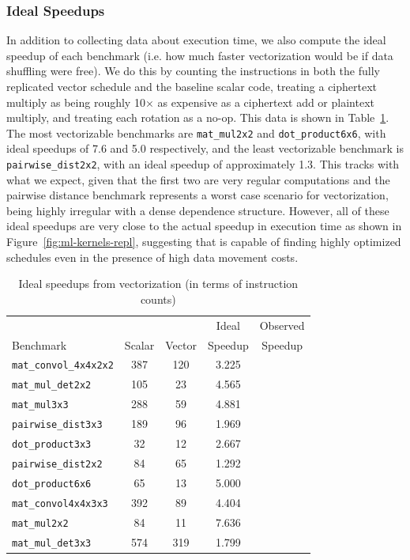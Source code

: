 \subsubsection*{Ideal Speedups}
In addition to collecting data about execution time, we also compute the ideal speedup of each benchmark (i.e. how much faster vectorization would be if data shuffling were free).
We do this by counting the instructions in both the fully replicated vector schedule and the baseline scalar code, treating a ciphertext multiply as being roughly 10$\times$ as expensive as a ciphertext add or plaintext multiply, and treating each rotation as a no-op. 
This data is shown in Table~\ref{tab:ideal-speedup}.
The most vectorizable benchmarks are \texttt{mat\_mul2x2} and \texttt{dot\_product6x6}, with ideal speedups of 7.6 and 5.0 respectively, and the least vectorizable benchmark is \texttt{pairwise\_dist2x2}, with an ideal speedup of approximately 1.3.
This tracks with what we expect, given that the first two are very regular computations and the pairwise distance benchmark represents a worst case scenario for vectorization, being highly irregular with a dense dependence structure.
However, all of these ideal speedups are very close to the actual speedup in execution time as shown in Figure~\ref{fig:ml-kernels-repl}, suggesting that \system is capable of finding highly optimized schedules even in the presence of high data movement costs.


\begin{table}
    \begin{tabular}{lcccc}
        \toprule    
         & & & Ideal & Observed\\
        Benchmark & Scalar & Vector & Speedup & Speedup\\\midrule
        \texttt{mat\_convol\_4x4x2x2} & 387 & 120 & 3.225\\
        \texttt{mat\_mul\_det2x2} & 105 & 23 & 4.565\\
        \texttt{mat\_mul3x3} & 288 & 59 & 4.881\\
        \texttt{pairwise\_dist3x3} & 189 & 96 & 1.969\\
        \texttt{dot\_product3x3} & 32 & 12 & 2.667\\
        \texttt{pairwise\_dist2x2} & 84 & 65 & 1.292\\
        \texttt{dot\_product6x6} & 65 & 13 & 5.000\\
        \texttt{mat\_convol4x4x3x3} & 392 & 89 & 4.404\\
        \texttt{mat\_mul2x2} & 84 & 11 & 7.636\\
        \texttt{mat\_mul\_det3x3} & 574 & 319 & 1.799\\\bottomrule
    \end{tabular}
    \caption{Ideal speedups from vectorization (in terms of instruction counts)}\label{tab:ideal-speedup}
\end{table}


